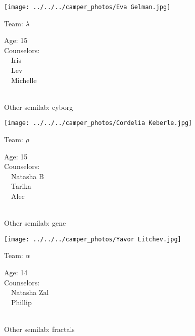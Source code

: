 \documentclass[10pt,letterpaper, landscape]{article}
\begin{document}
\horizontalshiftfornextsticker
\renewcommand{\baselinestretch}{1} \begin{sticker}
\noindent\begin{minipage}{0.5\textwidth}\texttt{[image: ../../../camper\_photos/Eva Gelman.jpg]}\end{minipage}\begin{minipage}{0.45\textwidth}
Team: {\Large $\lambda$}

Age:        15\\
Counselors: \\\ \ Iris\\\ \ Lev\\\ \ Michelle\\
\end{minipage} \\ \vspace{0.07in}
Other semilab: cyborg
\end{sticker}
\horizontalshiftfornextsticker
\renewcommand{\baselinestretch}{1} \begin{sticker}
\noindent\begin{minipage}{0.5\textwidth}\texttt{[image: ../../../camper\_photos/Cordelia Keberle.jpg]}\end{minipage}\begin{minipage}{0.45\textwidth}
Team: {\Large $\rho$}

Age:        15\\
Counselors: \\\ \ Natasha B\\\ \ Tarika\\\ \ Alec\\
\end{minipage} \\ \vspace{0.07in}
Other semilab: gene
\end{sticker}
\verticalshiftfornextsticker
\renewcommand{\baselinestretch}{1} \begin{sticker}
\noindent\begin{minipage}{0.5\textwidth}\texttt{[image: ../../../camper\_photos/Yavor Litchev.jpg]}\end{minipage}\begin{minipage}{0.45\textwidth}
Team: {\Large $\alpha$}

Age:        14\\
Counselors: \\\ \ Natasha Zal\\\ \ Phillip\\
\end{minipage} \\ \vspace{0.07in}
Other semilab: fractals
\end{sticker}
\end{document}
